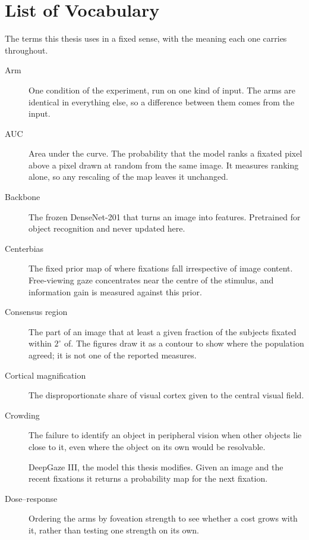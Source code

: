 \chapter*{List of Vocabulary}

The terms this thesis uses in a fixed sense, with the meaning each one carries throughout.

\begin{description}

\item[Arm] One condition of the experiment, run on one kind of input. The arms are identical in
  everything else, so a difference between them comes from the input.

\item[AUC] Area under the curve. The probability that the model ranks a fixated pixel above a pixel drawn
  at random from the same image. It measures ranking alone, so any rescaling of the map leaves it
  unchanged.

\item[Backbone] The frozen DenseNet-201 that turns an image into features. Pretrained for object
  recognition and never updated here.

\item[Centerbias] The fixed prior map of where fixations fall irrespective of image content.
  Free-viewing gaze concentrates near the centre of the stimulus, and information gain is measured
  against this prior.

\item[Consensus region] The part of an image that at least a given fraction of the subjects fixated
  within $2^\circ$ of. The figures draw it as a contour to show where the population agreed; it is
  not one of the reported measures.

\item[Cortical magnification] The disproportionate share of visual cortex given to the central visual
  field.

\item[Crowding] The failure to identify an object in peripheral vision when other objects lie close to
  it, even where the object on its own would be resolvable.

\item[\dg{}] DeepGaze III, the model this thesis modifies. Given an image and the recent fixations it
  returns a probability map for the next fixation.

\item[Dose--response] Ordering the arms by foveation strength to see whether a cost grows with it,
  rather than testing one strength on its own.


\end{description}

